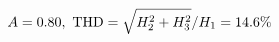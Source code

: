 \documentclass[preview]{standalone}
\begin{document}
\begin{align*}
\special{dvisvgm:raw <g id='unique000'>}A=0.80,\ \text{THD}=\sqrt{H_2^2+H_3^2}/H_1=14.6\%\special{dvisvgm:raw </g>}
\end{align*}
\end{document}
